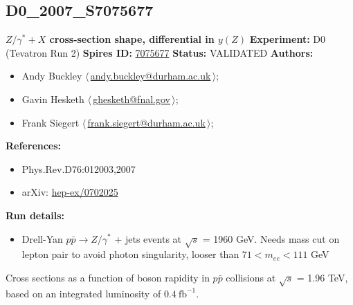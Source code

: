 \clearpage


\clearpage

\subsection[D0\_2007\_S7075677]{D0\_2007\_S7075677\,\cite{Abazov:2007jy}}
\textbf{$Z/\gamma^* + X$ cross-section shape, differential in $y(Z)$}\newline
\textbf{Experiment:} D0 (Tevatron Run 2) \newline
\textbf{Spires ID:} \href{http://www.slac.stanford.edu/spires/find/hep/www?rawcmd=key+7075677}{7075677}\newline
\textbf{Status:} VALIDATED\newline
\textbf{Authors:}
\begin{itemize}
  \item Andy Buckley $\langle\,$\href{mailto:andy.buckley@durham.ac.uk}{andy.buckley@durham.ac.uk}$\,\rangle$;
  \item Gavin Hesketh $\langle\,$\href{mailto:ghesketh@fnal.gov}{ghesketh@fnal.gov}$\,\rangle$;
  \item Frank Siegert $\langle\,$\href{mailto:frank.siegert@durham.ac.uk}{frank.siegert@durham.ac.uk}$\,\rangle$;
\end{itemize}
\textbf{References:}
\begin{itemize}
  \item Phys.Rev.D76:012003,2007
  \item arXiv: \href{http://arxiv.org/abs/hep-ex/0702025}{hep-ex/0702025}
\end{itemize}
\textbf{Run details:}
\begin{itemize}

  \item Drell-Yan $p \bar{p} \to Z/\gamma^*$ + jets events at $\sqrt{s}$ = 1960 GeV. Needs mass cut on lepton pair to avoid photon singularity, looser than  $71 < m_{ee} < 111$ GeV\end{itemize}

\noindent Cross sections as a function of boson rapidity in $p \bar{p}$  collisions at $\sqrt{s}$ = 1.96 TeV, based on an integrated luminosity  of $0.4~\text{fb}^{-1}$.

\clearpage


\clearpage

